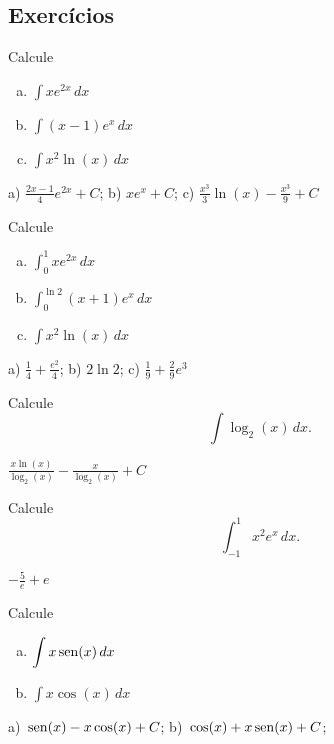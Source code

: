 \subsection{Exercícios}

\begin{exer}
  Calcule
  \begin{enumerate}[a)]
  \item $\displaystyle\int xe^{2x}\,dx$
  \item $\displaystyle\int (x-1)e^x\,dx$
  \item $\displaystyle\int x^2\ln(x)\,dx$
  \end{enumerate}
\end{exer}
\begin{resp}
  a) $\frac{2x-1}{4}e^{2x} + C$; b) $xe^x + C$; c) $\frac{x^3}{3}\ln(x) - \frac{x^3}{9} + C$
\end{resp}

\begin{exer}
  Calcule
  \begin{enumerate}[a)]
  \item $\displaystyle\int_0^1 xe^{2x}\,dx$
  \item $\displaystyle\int_0^{\ln 2} (x+1)e^x\,dx$
  \item $\displaystyle\int x^2\ln(x)\,dx$
  \end{enumerate}
\end{exer}
\begin{resp}
  a) $\frac{1}{4} + \frac{e^2}{4}$; b) $2\ln 2$; c) $\frac{1}{9} + \frac{2}{9}e^{3}$
\end{resp}

\begin{exer}
  Calcule
  \begin{equation}
    \int\log_2(x)\,dx.
  \end{equation}
\end{exer}
\begin{resp}
  $\displaystyle \frac{x\ln(x)}{\log_2(x)}-\frac{x}{\log_2(x)} + C$
\end{resp}

\begin{exer}
  Calcule
  \begin{equation}
    \int_{-1}^1 x^2e^x\,dx.
  \end{equation}
\end{exer}
\begin{resp}
  $-\frac{5}{e}+e$
\end{resp}

\begin{exer}
  Calcule
  \begin{enumerate}[a)]
  \item $\displaystyle \int x\operatorname{sen}(x)\,dx$
  \item $\displaystyle \int x\cos(x)\,dx$
  \end{enumerate}
\end{exer}
\begin{resp}
  a)~$\displaystyle \operatorname{sen}(x)-x\cos(x)+C$; b)~$\displaystyle \cos(x)+x\operatorname{sen}(x)+C$;
\end{resp}

